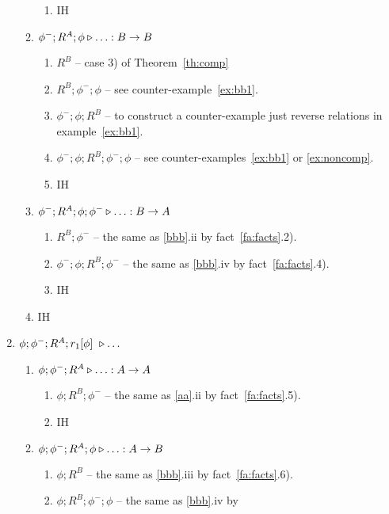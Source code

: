 \documentclass[10pt]{article}
\begin{document}
\begin{Proof}
\begin{enumerate}
\begin{enumerate}
\begin{enumerate}
      \item IH
    \end{enumerate}
   \item\label{bbb} $\phi^-;R^A;\phi \triangleright\ldots :B\rightarrow B$
    \begin{enumerate}\MyLPar
     \item $R^B$ -- case 3) of Theorem~\ref{th:comp}
     \item $R^B;\phi^-;\phi$ -- see counter-example~\ref{ex:bb1}.
     \item $\phi^-;\phi;R^B$ -- to construct a counter-example just
           reverse relations in example~\ref{ex:bb1}.
     \item $\phi^-;\phi;R^B;\phi^-;\phi$ -- see counter-examples~\ref{ex:bb1} 
           or \ref{ex:noncomp}.
     \item IH
    \end{enumerate}
   \item\label{ccc} $\phi^-;R^A;\phi;\phi^-\triangleright\ldots :B\rightarrow A$
    \begin{enumerate}\MyLPar
     \item $R^B;\phi^-$ -- the same as \ref{bbb}.ii by fact~\ref{fa:facts}.2).
     \item $\phi^-;\phi;R^B;\phi^-$ -- the same as \ref{bbb}.iv by 
           fact~\ref{fa:facts}.4).
     \item IH
    \end{enumerate}
   \item IH
  \end{enumerate}
\item $\phi;\phi^-;R^A;\Ra\ \almost\ldots$
  \begin{enumerate}\MyLPar
   \item $\phi;\phi^-;R^A \triangleright \ldots :A\rightarrow A$
    \begin{enumerate}\MyLPar
      \item $\phi;R^B;\phi^-$ -- the same as \ref{aa}.ii 
              by fact~\ref{fa:facts}.5).
      \item IH
    \end{enumerate}
   \item $\phi;\phi^-;R^A;\phi \triangleright\ldots :A\rightarrow B$
    \begin{enumerate}\MyLPar
     \item $\phi;R^B$ -- the same as \ref{bbb}.iii by fact~\ref{fa:facts}.6).
     \item $\phi;R^B;\phi^-;\phi$ -- the same as \ref{bbb}.iv by 

\end{enumerate}
\end{enumerate}
\end{enumerate}
\end{Proof}
\end{document}
